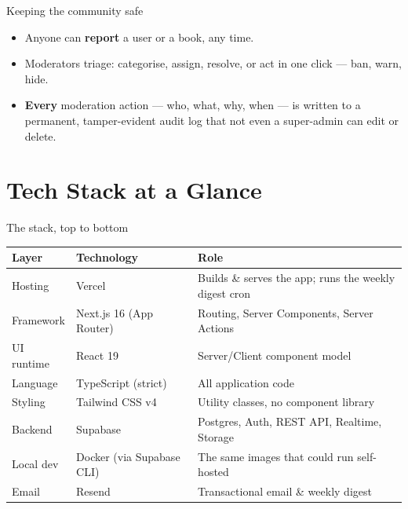 \documentclass[aspectratio=169,11pt]{beamer}
\begin{document}
\begin{frame}{Keeping the community safe}
  \begin{itemize}
    \item Anyone can \textbf{report} a user or a book, any time.
    \item Moderators triage: categorise, assign, resolve, or act in one click --- ban, warn, hide.
    \item \textbf{Every} moderation action --- who, what, why, when --- is written to a permanent, tamper-evident audit log that not even a super-admin can edit or delete.
  \end{itemize}
\end{frame}

\section{Tech Stack at a Glance}

\begin{frame}{The stack, top to bottom}
  \begin{center}
  \footnotesize
  \begin{tabular}{@{}p{2.6cm}p{3.6cm}p{5.6cm}@{}}
    \toprule
    \textbf{Layer} & \textbf{Technology} & \textbf{Role} \\
    \midrule
    Hosting & Vercel & Builds \& serves the app; runs the weekly digest cron \\
    Framework & Next.js 16 (App Router) & Routing, Server Components, Server Actions \\
    UI runtime & React 19 & Server/Client component model \\
    Language & TypeScript (strict) & All application code \\
    Styling & Tailwind CSS v4 & Utility classes, no component library \\
    Backend & Supabase & Postgres, Auth, REST API, Realtime, Storage \\
    Local dev & Docker (via Supabase CLI) & The same images that could run self-hosted \\
    Email & Resend & Transactional email \& weekly digest \\
    \bottomrule
  \end{tabular}
  \end{center}
\end{frame}
\end{document}
